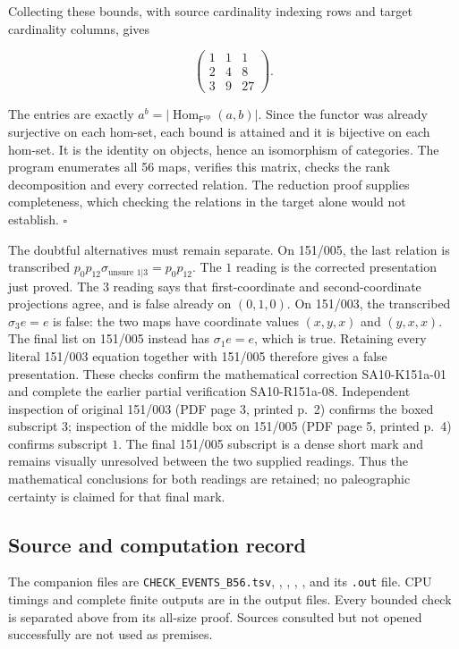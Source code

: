 Collecting these bounds, with source cardinality indexing rows and
target cardinality columns, gives

\[\begin{pmatrix}1&1&1\\2&4&8\\3&9&27\end{pmatrix}.\]

The entries are exactly
\(a^b=|\operatorname{Hom}_{\mathsf F^{\mathrm{op}}}(a,b)|\). Since the
functor was already surjective on each hom-set, each bound is attained
and it is bijective on each hom-set. It is the identity on objects,
hence an isomorphism of categories. The program enumerates all 56 maps,
verifies this matrix, checks the rank decomposition and every corrected
relation. The reduction proof supplies completeness, which checking the
relations in the target alone would not establish. \(\square\)

The doubtful alternatives must remain separate. On 151/005, the last
relation is transcribed
\(p_0p_{12}\sigma_{\text{unsure }1|3}=p_0p_{12}\). The \(1\) reading is
the corrected presentation just proved. The \(3\) reading says that
first-coordinate and second-coordinate projections agree, and is false
already on \((0,1,0)\). On 151/003, the transcribed \(\sigma_3e=e\) is
false: the two maps have coordinate values \((x,y,x)\) and \((y,x,x)\).
The final list on 151/005 instead has \(\sigma_1e=e\), which is true.
Retaining every literal 151/003 equation together with 151/005 therefore
gives a false presentation. These checks confirm the mathematical
correction SA10-K151a-01 and complete the earlier partial verification
SA10-R151a-08. Independent inspection of original 151/003 (PDF page 3, printed p.~2)
confirms the boxed subscript \(3\); inspection of the middle box on
151/005 (PDF page 5, printed p.~4) confirms subscript \(1\).
The final 151/005 subscript is a dense short mark and remains visually
unresolved between the two supplied readings.  Thus the mathematical
conclusions for both readings are retained; no paleographic certainty
is claimed for that final mark.

\subsection{Source and computation
record}\label{source-and-computation-record}

The companion files are \texttt{CHECK\_EVENTS\_B56.tsv},
, ,
,
, and its
\texttt{.out} file. CPU timings and complete finite outputs are in the
output files. Every bounded check is separated above from its all-size
proof. Sources consulted but not opened successfully are not used as
premises.
